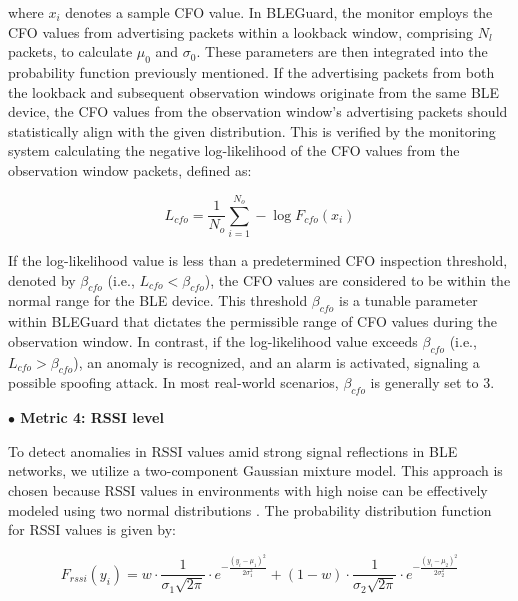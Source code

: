 where $ x_i $ denotes a sample CFO value. In BLEGuard, the monitor employs the CFO values from advertising packets within a lookback window, comprising $ N_l $ packets, to calculate $ \mu_{0} $ and $ \sigma_{0} $. These parameters are then integrated into the probability function previously mentioned. If the advertising packets from both the lookback and subsequent observation windows originate from the same BLE device, the CFO values from the observation window's advertising packets should statistically align with the given distribution. This is verified by the monitoring system calculating the negative log-likelihood of the CFO values from the observation window packets, defined as:

\vspace{-4pt}

\begin{equation}
L_{cfo} = \frac{1}{N_o} \sum_{i=1}^{N_o} -\log F_{cfo}(x_i)
\end{equation}

If the log-likelihood value is less than a predetermined CFO inspection threshold, denoted by $ \beta_{cfo} $ (i.e., $ L_{cfo} < \beta_{cfo} $), the CFO values are considered to be within the normal range for the BLE device. This threshold $ \beta_{cfo} $ is a tunable parameter within BLEGuard that dictates the permissible range of CFO values during the observation window. In contrast, if the log-likelihood value exceeds $ \beta_{cfo} $ (i.e., $ L_{cfo} > \beta_{cfo} $), an anomaly is recognized, and an alarm is activated, signaling a possible spoofing attack. In most real-world scenarios, $\beta_{cfo}$ is generally set to 3.

\vspace{6pt}

\noindent \textbf{$\bullet$ Metric 4: RSSI level}

\noindent To detect anomalies in RSSI values amid strong signal reflections in BLE networks, we utilize a two-component Gaussian mixture model. This approach is chosen because RSSI values in environments with high noise can be effectively modeled using two normal distributions \cite{sheng2008detecting}. The probability distribution function for RSSI values is given by:

\vspace{-4pt}

\begin{equation}
\label{eq4-1}
F_{rssi}\left(y_i\right)=w \cdot \frac{1}{\sigma_1 \sqrt{2 \pi}} \cdot e^{-\frac{\left(y_i-\mu_1\right)^2}{2 \sigma_1^2}}+(1-w) \cdot \frac{1}{\sigma_2 \sqrt{2 \pi}} \cdot e^{-\frac{\left(y_i-\mu_2\right)^2}{2 \sigma_2^2}}
\end{equation}

